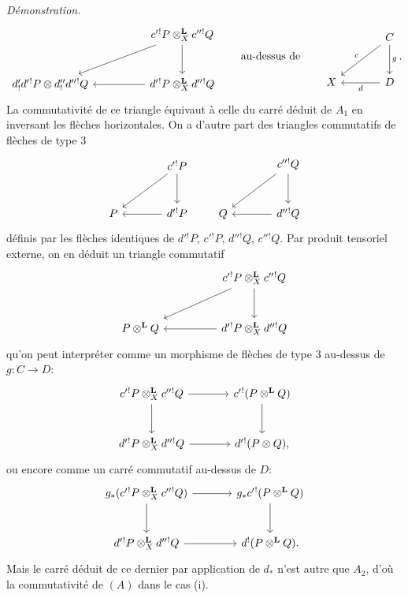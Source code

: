 \documentclass[11pt]{article}
\newenvironment{prooftext}[1][Proof]{\par\noindent\emph{#1.}\ }{\par\medskip}
\begin{document}
\begin{prooftext}[Démonstration]
\[\begin{tikzcd}[column sep=huge,row sep=large]
& c'{}^!P\otimes_X^{\mathbf L}c''{}^!Q \arrow[d] \arrow[dl]\\
d'_!d'{}^!P\otimes d''_!d''{}^!Q &
d'{}^!P\otimes_X^{\mathbf L}d''{}^!Q\arrow[l]
\end{tikzcd}
\qquad\text{au-dessus de}\qquad
\begin{tikzcd}[column sep=large,row sep=large]
& C\arrow[d,"g"]\arrow[dl,"c"']\\
X & D\arrow[l,"d"]
\end{tikzcd}.
\]
La commutativité de ce triangle équivaut à celle du carré déduit de $A_1$ en inversant les flèches horizontales. On a d'autre part des triangles commutatifs de flèches de type $3$
\[
\begin{tikzcd}[column sep=large,row sep=large]
& c'{}^!P \arrow[d]\arrow[dl]\\
P & d'{}^!P\arrow[l]
\end{tikzcd}
\qquad
\begin{tikzcd}[column sep=large,row sep=large]
& c''{}^!Q \arrow[d]\arrow[dl]\\
Q & d''{}^!Q\arrow[l]
\end{tikzcd}
\]
définis par les flèches identiques de $d'{}^!P$, $c'{}^!P$, $d''{}^!Q$, $c''{}^!Q$. Par produit tensoriel externe, on en déduit un triangle commutatif
\[
\begin{tikzcd}[column sep=huge,row sep=large]
& c'{}^!P\otimes_X^{\mathbf L}c''{}^!Q \arrow[d]\arrow[dl]\\
P\otimes^{\mathbf L}Q & d'{}^!P\otimes_X^{\mathbf L}d''{}^!Q\arrow[l]
\end{tikzcd}
\]
qu'on peut interpréter comme un morphisme de flèches de type $3$ au-dessus de $g:C\longrightarrow D$:
\[
\begin{tikzcd}[column sep=large,row sep=large]
c'{}^!P\otimes_X^{\mathbf L}c''{}^!Q \arrow[r]\arrow[d] &
c'{}^!(P\otimes^{\mathbf L}Q)\arrow[d]\\
d'{}^!P\otimes_X^{\mathbf L}d''{}^!Q \arrow[r] &
d'{}^!(P\otimes Q),
\end{tikzcd}
\]
ou encore comme un carré commutatif au-dessus de $D$:
\[
\begin{tikzcd}[column sep=large,row sep=large]
g_*(c'{}^!P\otimes_X^{\mathbf L}c''{}^!Q) \arrow[r]\arrow[d] &
g_*c'{}^!(P\otimes^{\mathbf L}Q)\arrow[d]\\
d'{}^!P\otimes_X^{\mathbf L}d''{}^!Q \arrow[r] &
d^!(P\otimes^{\mathbf L}Q).
\end{tikzcd}
\]
Mais le carré déduit de ce dernier par application de $d_*$ n'est autre que $A_2$, d'où la commutativité de $(A)$ dans le cas (i).


\end{prooftext}
\end{document}
